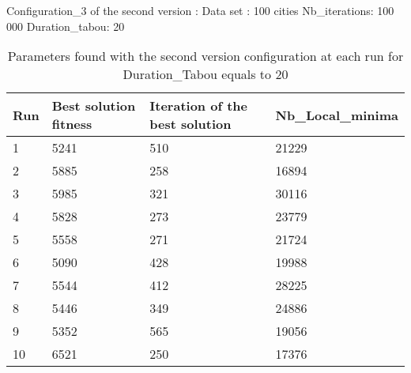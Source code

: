 \documentclass[12pt,oneside,a4paper]{article}
\begin{document}
Configuration\_3 of the second version : 
\newline
Data set : 100 cities 
\newline
Nb\_iterations: 100 000 
\newline
Duration\_tabou: 20
\begin{table}[h]
    \centering
    \small
    \begin{tabular}{llll}
      \hline
      \multicolumn{1}{|l|}{\textbf{Run}}& \multicolumn{1}{l|}{\textbf{Best solution fitness}}& \multicolumn{1}{l|}{\textbf{Iteration of the best solution}}& \multicolumn{1}{l|}{\textbf{Nb\_Local\_minima}}\\ \hline
      \multicolumn{1}{|l|}{1} & \multicolumn{1}{l|}{5241}  & \multicolumn{1}{l|}{510} & \multicolumn{1}{l|}{21229}  \\ \hline
      \multicolumn{1}{|l|}{2} & \multicolumn{1}{l|}{5885}  & \multicolumn{1}{l|}{258} & \multicolumn{1}{l|}{16894}  \\ \hline         
      \multicolumn{1}{|l|}{3} & \multicolumn{1}{l|}{5985}  & \multicolumn{1}{l|}{321}  & \multicolumn{1}{l|}{30116}  \\ \hline
      \multicolumn{1}{|l|}{4} & \multicolumn{1}{l|}{5828}  & \multicolumn{1}{l|}{273}  & \multicolumn{1}{l|}{23779}  \\ \hline
      \multicolumn{1}{|l|}{5} & \multicolumn{1}{l|}{5558}  & \multicolumn{1}{l|}{271}  & \multicolumn{1}{l|}{21724}  \\ \hline
      \multicolumn{1}{|l|}{6} & \multicolumn{1}{l|}{5090}  & \multicolumn{1}{l|}{428}  & \multicolumn{1}{l|}{19988}  \\ \hline
      \multicolumn{1}{|l|}{7} & \multicolumn{1}{l|}{5544}  & \multicolumn{1}{l|}{412}  & \multicolumn{1}{l|}{28225}  \\ \hline
      \multicolumn{1}{|l|}{8} & \multicolumn{1}{l|}{5446}  & \multicolumn{1}{l|}{349} & \multicolumn{1}{l|}{24886}  \\ \hline
      \multicolumn{1}{|l|}{9} & \multicolumn{1}{l|}{5352}  & \multicolumn{1}{l|}{565} & \multicolumn{1}{l|}{19056}  \\ \hline
      \multicolumn{1}{|l|}{10} & \multicolumn{1}{l|}{6521}  & \multicolumn{1}{l|}{250} & \multicolumn{1}{l|}{17376}  \\ \hline
    \end{tabular}
    \caption{Parameters found with the second version configuration at each run for Duration\_Tabou equals to 20}
  \end{table}
\end{document}

